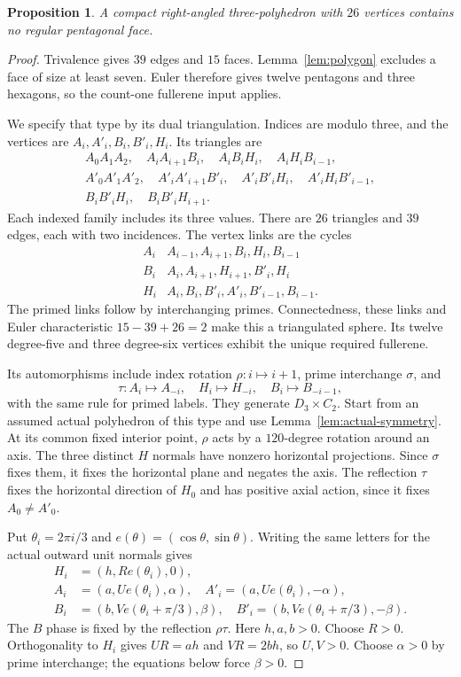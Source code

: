 \documentclass[11pt]{article}
\newtheorem{proposition}[theorem]{Proposition}
\theoremstyle{remark}
\begin{document}
\begin{proposition}\label{prop:c26}
A compact right-angled three-polyhedron with $26$ vertices contains no
regular pentagonal face.
\end{proposition}
\begin{proof}
Trivalence gives $39$ edges and $15$ faces. Lemma~\ref{lem:polygon}
excludes a face of size at least seven. Euler therefore gives twelve
pentagons and three hexagons, so the count-one fullerene input applies.

We specify that type by its dual triangulation. Indices are modulo three,
and the vertices are $A_i,A'_i,B_i,B'_i,H_i$. Its triangles are
\[
 \begin{gathered}
 A_0A_1A_2,\quad A_iA_{i+1}B_i,\quad A_iB_iH_i,
       \quad A_iH_iB_{i-1},\\
 A'_0A'_1A'_2,\quad A'_iA'_{i+1}B'_i,\quad A'_iB'_iH_i,
       \quad A'_iH_iB'_{i-1},\\
 B_iB'_iH_i,\quad B_iB'_iH_{i+1}.
 \end{gathered}
\]
Each indexed family includes its three values. There are $26$ triangles
and $39$ edges, each with two incidences. The vertex links are the cycles
\[
 \begin{array}{c|l}
 A_i&A_{i-1},A_{i+1},B_i,H_i,B_{i-1}\\
 B_i&A_i,A_{i+1},H_{i+1},B'_i,H_i\\
 H_i&A_i,B_i,B'_i,A'_i,B'_{i-1},B_{i-1}.
 \end{array}
\]
The primed links follow by interchanging primes. Connectedness, these
links and Euler characteristic $15-39+26=2$ make this a triangulated
sphere. Its twelve degree-five and three degree-six vertices exhibit
the unique required fullerene.

Its automorphisms include index rotation $\rho:i\mapsto i+1$, prime
interchange $\sigma$, and
\[
 \tau:A_i\mapsto A_{-i},\quad H_i\mapsto H_{-i},
       \quad B_i\mapsto B_{-i-1},
\]
with the same rule for primed labels. They generate $D_3\times C_2$.
Start from an assumed actual polyhedron of this type and use
Lemma~\ref{lem:actual-symmetry}. At its common fixed interior point,
$\rho$ acts by a $120$-degree rotation around an axis. The three
distinct $H$ normals have nonzero horizontal projections. Since
$\sigma$ fixes them, it fixes the horizontal plane and negates the
axis. The reflection $\tau$ fixes the horizontal direction of $H_0$
and has positive axial action, since it fixes $A_0\ne A'_0$.

Put $\theta_i=2\pi i/3$ and $e(\theta)=(\cos\theta,\sin\theta)$.
Writing the same letters for the actual outward unit normals gives
\[
 \begin{split}
 H_i&=(h,R e(\theta_i),0),\\
 A_i&=(a,U e(\theta_i),\alpha),\quad
 A'_i=(a,U e(\theta_i),-\alpha),\\
 B_i&=(b,V e(\theta_i+\pi/3),\beta),\quad
 B'_i=(b,V e(\theta_i+\pi/3),-\beta).
 \end{split}
\]
The $B$ phase is fixed by the reflection $\rho\tau$. Here $h,a,b>0$.
Choose $R>0$. Orthogonality to $H_i$ gives $UR=ah$ and $VR=2bh$,
so $U,V>0$. Choose $\alpha>0$ by prime interchange; the equations
below force $\beta>0$.


\end{proof}
\end{document}
